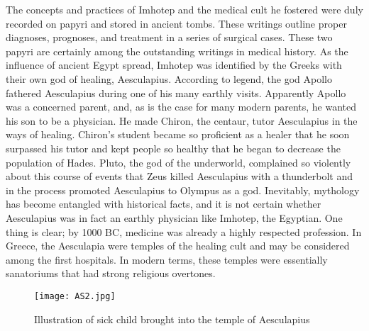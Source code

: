 \documentclass[12pt]{article}
\begin{document}
The concepts and practices of Imhotep and the medical cult he fostered were duly recorded on papyri and stored in ancient tombs.
These writings outline proper diagnoses, prognoses, and treatment in a series of surgical cases.
These two papyri are certainly among the outstanding writings in medical history.
As the influence of ancient Egypt spread, Imhotep was identified by the Greeks with their own god of healing, Aesculapius.
According to legend, the god Apollo fathered Aesculapius during one of his many earthly visits.
Apparently Apollo was a concerned parent, and, as is the case for many modern parents, he wanted his son to be a physician.
He made Chiron, the centaur, tutor Aesculapius in the ways of healing.
Chiron's student became so proficient as a healer that he soon surpassed his tutor and kept people so healthy that he began to decrease the population of Hades.
Pluto, the god of the underworld, complained so violently about this course of events that Zeus killed Aesculapius with a thunderbolt and in the process promoted Aesculapius to Olympus as a god.
Inevitably, mythology has become entangled with historical facts, and it is not certain whether Aesculapius was in fact an earthly physician like Imhotep, the Egyptian.
One thing is clear; by 1000 BC, medicine was already a highly respected profession.
In Greece, the Aesculapia were temples of the healing cult and may be considered among the first hospitals.
In modern terms, these temples were essentially sanatoriums that had strong religious overtones.\\

\begin{figure}[h]
\centering
\texttt{[image: AS2.jpg]}
\caption{Illustration of sick child brought into the temple of Aesculapius}
\label{fig_AS2}
\end{figure}
\end{document}
